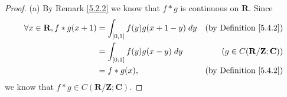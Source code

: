 \begin{proof}{(a)}
    By Remark \ref{5.2.2} we know that \(f * g\) is continuous on \(\mathbf{R}\).
    Since
    \begin{align*}
        \forall x \in \mathbf{R}, f * g(x + 1) & = \int_{[0, 1]} f(y) g(x + 1 - y) \; dy & \text{(by Definition \ref{5.4.2})}              \\
                                               & = \int_{[0, 1]} f(y) g(x - y) \; dy     & (g \in C(\mathbf{R} / \mathbf{Z} ; \mathbf{C})) \\
                                               & = f * g(x),                             & \text{(by Definition \ref{5.4.2})}
    \end{align*}
    we know that \(f * g \in C(\mathbf{R} / \mathbf{Z} ; \mathbf{C})\).
\end{proof}

